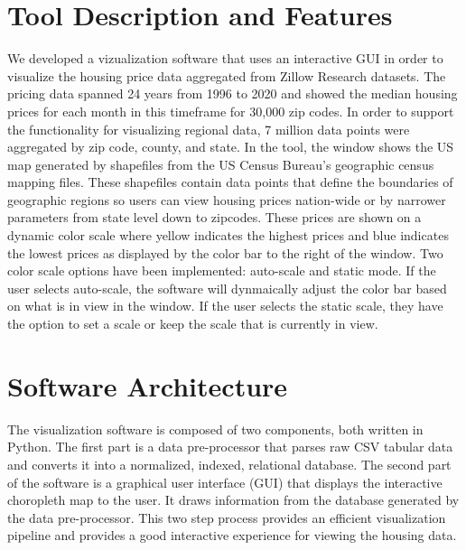 \documentclass{article}
\begin{document}
\section{Tool Description and Features}
We developed a vizualization software that uses an interactive GUI in order to visualize the housing price data aggregated from Zillow Research datasets. The
pricing data spanned 24 years from 1996 to 2020 and showed the median housing prices for each month in this timeframe for 30,000 zip codes. In order to support the
functionality for visualizing regional data, 7 million data points were aggregated by zip code, county, and state. In the tool, the window
shows the US map generated by shapefiles from the US Census Bureau's geographic census mapping files. These shapefiles contain data points that define the
boundaries of geographic regions so users can view housing prices nation-wide or by narrower parameters from state level down to zipcodes. These prices are shown
on a dynamic color scale where yellow indicates the highest prices and blue indicates the lowest prices as displayed by the color bar to the right of the window.
Two color scale options have been implemented: auto-scale and static mode. If the user selects auto-scale, the software will dynmaically adjust the color bar based
on what is in view in the window. If the user selects the static scale, they have the option to set a scale or keep the scale that is currently in view. 


\section{Software Architecture}
The visualization software is composed of two components, both written in Python. The first 
part is a data pre-processor that parses raw CSV tabular data and converts it into
a normalized, indexed, relational database. The second part of the software is a graphical user interface (GUI) that 
displays the interactive choropleth map to the user. It draws information 
from the database generated by the data pre-processor. This two step process provides an
efficient visualization pipeline and provides a good interactive experience for viewing the housing data.
\end{document}
